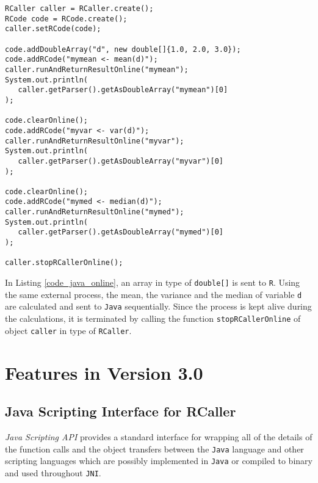 \documentclass[10pt,a4paper, final, oneside]{article}
\begin{document}
\begin{minipage}{\linewidth}
\begin{lstlisting}[caption=RCaller Online,label=code_java_online]
RCaller caller = RCaller.create();
RCode code = RCode.create();
caller.setRCode(code);

code.addDoubleArray("d", new double[]{1.0, 2.0, 3.0});
code.addRCode("mymean <- mean(d)");
caller.runAndReturnResultOnline("mymean");
System.out.println(
   caller.getParser().getAsDoubleArray("mymean")[0]
);

code.clearOnline();
code.addRCode("myvar <- var(d)");
caller.runAndReturnResultOnline("myvar");
System.out.println(
   caller.getParser().getAsDoubleArray("myvar")[0]
);

code.clearOnline();
code.addRCode("mymed <- median(d)");
caller.runAndReturnResultOnline("mymed");
System.out.println(
   caller.getParser().getAsDoubleArray("mymed")[0]
);

caller.stopRCallerOnline();
\end{lstlisting}
\end{minipage}

In Listing \ref{code_java_online}, an array in type of \texttt{double[]} is sent to \texttt{R}. Using the same external process, the mean, the variance and the median of variable \texttt{d} are calculated and sent to \texttt{Java} sequentially. Since the process is kept alive during the calculations, it is terminated by calling the function \texttt{stopRCallerOnline} of object \texttt{caller} in type of \texttt{RCaller}.

\section{Features in Version 3.0}
\label{sec:features_in_version_3}

\subsection{Java Scripting Interface for RCaller}
\label{sec:javax_script_interface}
\emph{Java Scripting API} provides a standard interface for wrapping all of the details of the function calls and the object transfers between the \texttt{Java} language and other scripting languages which are possibly implemented in \texttt{Java} or compiled to binary and used throughout \texttt{JNI}. 
\end{document}
